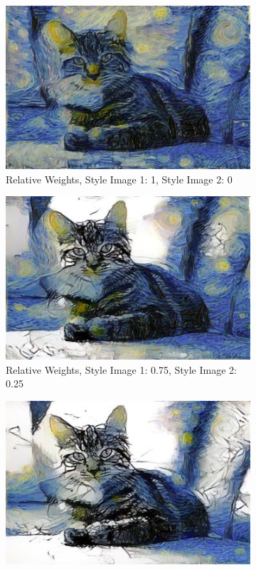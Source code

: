 \documentclass{article}
\begin{document}
\begin{figure}[H]
\begin{subfigure}{.5\textwidth}
  \centering
  \includegraphics[width=.8\linewidth]{i0}
  \caption{Relative Weights, Style Image 1: 1, Style Image 2: 0}
  \label{fig:sfig1}
\end{subfigure}
\begin{subfigure}{.5\textwidth}
  \centering
  \includegraphics[width=.8\linewidth]{i25}
  \caption{Relative Weights, Style Image 1: 0.75, Style Image 2: 0.25}
  \label{fig:sfig2}
\end{subfigure}
\begin{subfigure}{.5\textwidth}
  \centering
  \includegraphics[width=.8\linewidth]{i50}

\end{subfigure}
\end{figure}
\end{document}
